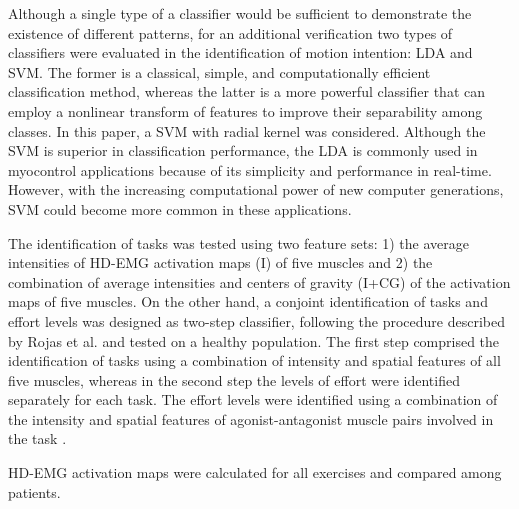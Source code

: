 Although a single type of a classifier would be sufficient to demonstrate the existence of different patterns, for an additional verification two types of classifiers were evaluated in the identification of motion intention: LDA and SVM. The former is a classical, simple, and computationally efficient classification method, whereas the latter is a more powerful classifier that can employ a nonlinear transform of features to improve their separability among classes. In this paper, a SVM with radial kernel was considered. Although the SVM is superior in classification performance, the LDA is commonly used in myocontrol applications because of its simplicity and performance in real-time. However, with the increasing computational power of new computer generations, SVM could become more common in these applications. 

The identification of tasks was tested using two feature sets: 1) the average intensities of HD-EMG activation maps (I) of five muscles and 2) the combination of average intensities and centers of gravity (I+CG) of the activation maps of five muscles.
On the other hand, a conjoint identification of tasks and effort levels was designed as two-step classifier, following the procedure described by Rojas et al. \citep{Rojas-Martinez2013} and tested on a healthy population. The first step comprised the identification of tasks using a combination of intensity and spatial features of all five muscles, whereas in the second step the levels of effort were identified separately for each task. The effort levels were identified using a combination of the intensity and spatial features of agonist-antagonist muscle pairs involved in the task \citep{Rojas-Martinez2013}.

HD-EMG activation maps were calculated for all exercises and compared among patients. 

